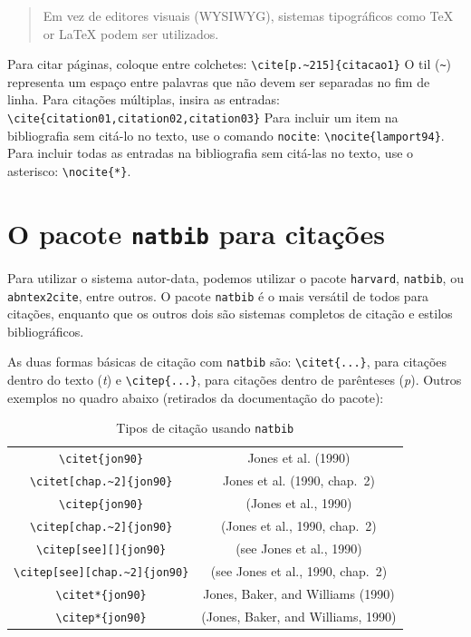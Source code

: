 \begin{quote}
Em vez de editores visuais (WYSIWYG), sistemas tipográficos como \TeX{} or \LaTeX{} \parencite{lamport94} podem ser utilizados.
\end{quote}

Para citar páginas, coloque entre colchetes:
\verb+\cite[p.~215]{citacao1}+
O til (\verb+~+) representa um espaço entre palavras que não devem ser separadas no fim de linha. 
Para citações múltiplas, insira as entradas:\newline
\verb+\cite{citation01,citation02,citation03}+
Para incluir um item na bibliografia sem citá-lo no texto, use o comando \texttt{nocite}: \verb+\nocite{lamport94}+. Para incluir todas as entradas na bibliografia sem citá-las no texto, use o asterisco: \verb+\nocite{*}+. 

\section{O pacote \texttt{natbib} para citações}
\label{natbib}
Para utilizar o sistema autor-data, podemos utilizar o pacote \texttt{harvard}, \texttt{natbib}, ou \texttt{abntex2cite}, entre outros.
O pacote \texttt{natbib} é o mais versátil de todos para citações, enquanto que os outros dois são sistemas completos de citação e estilos bibliográficos.

As duas formas básicas de citação com \texttt{natbib} são: \verb+\citet{...}+, para citações dentro do texto (\textit{t}) e \verb+\citep{...}+, para citações dentro de parênteses (\textit{p}). Outros exemplos no quadro abaixo (retirados da documentação do pacote):


\begin{table}
\caption{\label{tab:natbib} Tipos de citação usando \texttt{natbib}}
\begin{tabular}{cc}
  \verb|\citet{jon90}| & Jones et al. (1990)\\
  \verb|\citet[chap.~2]{jon90}| & Jones et al. (1990, chap.~2)\\
  \verb|\citep{jon90}| & (Jones et al., 1990)\\
  \verb|\citep[chap.~2]{jon90}| & (Jones et al., 1990, chap.~2)\\
  \verb|\citep[see][]{jon90}| & (see Jones et al., 1990)\\
  \verb|\citep[see][chap.~2]{jon90}| & (see Jones et al., 1990, chap.~2)\\
  \verb|\citet*{jon90}| & Jones, Baker, and Williams (1990)\\
  \verb|\citep*{jon90}| & (Jones, Baker, and Williams, 1990)
\end{tabular}
\end{table}


